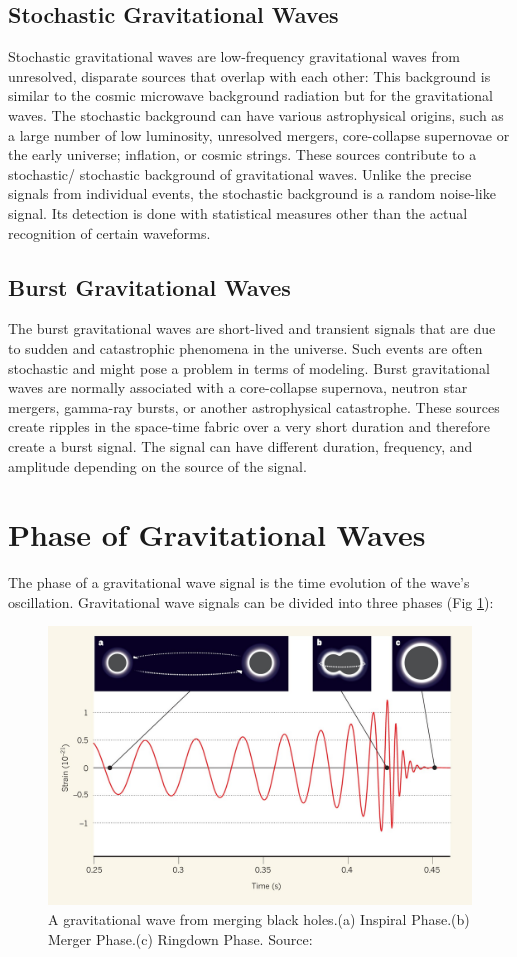 \subsection{Stochastic Gravitational Waves} 
Stochastic gravitational waves are low-frequency gravitational waves from unresolved, disparate sources that overlap with each other: This background is similar to the cosmic microwave background radiation but for the gravitational waves. The stochastic background can have various astrophysical origins, such as a large number of low luminosity, unresolved mergers, core-collapse supernovae or the early universe; inflation, or cosmic strings. These sources contribute to a stochastic/ stochastic background of gravitational waves. Unlike the precise signals from individual events, the stochastic background is a random noise-like signal. Its detection is done with statistical measures other than the actual recognition of certain waveforms.
\vspace{0.2cm}

\subsection{Burst Gravitational Waves}
The burst gravitational waves are short-lived and transient signals that are due to sudden and catastrophic phenomena in the universe. Such events are often stochastic and might pose a problem in terms of modeling. Burst gravitational waves are normally associated with a core-collapse supernova, neutron star mergers, gamma-ray bursts, or another astrophysical catastrophe. These sources create ripples in the space-time fabric over a very short duration and therefore create a burst signal. The signal can have different duration, frequency, and amplitude depending on the source of the signal.

\section{Phase of Gravitational Waves}
The phase of a gravitational wave signal is the time evolution of the wave's oscillation. Gravitational wave signals can be divided into three phases (Fig \ref{fig:phase}):
   \begin{figure}[h]
        \centering
        \includegraphics[width=4.5in]{images_/phase.jpg}
        \caption{A gravitational wave from merging black holes.(a) Inspiral Phase.(b) Merger Phase.(c) Ringdown Phase. Source: \citep{Miller2016}}
        \label{fig:phase}
    \end{figure}

